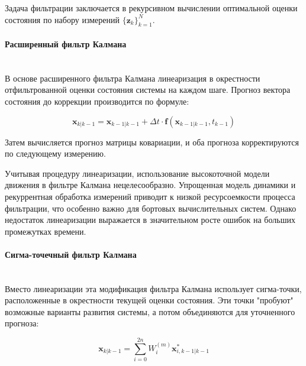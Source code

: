 Задача фильтрации заключается в рекурсивном вычислении оптимальной оценки состояния
по набору измерений $\{\mathbf{z}_k\}_{k=1}^N$. 

\paragraph{Расширенный фильтр Калмана} \mbox{} \\

В основе расширенного фильтра Калмана линеаризация в окрестности отфильтрованной
оценки состояния системы на каждом шаге. Прогноз вектора состояния до коррекции
производится по формуле:

\begin{equation*}
    \mathbf{x}_{k|k-1} = \mathbf{x}_{k-1|k-1} 
    + \Delta t \cdot \mathbf{f} (\mathbf{x}_{k-1|k-1}, t_{k-1})
\end{equation*}

Затем вычисляется прогноз матрицы ковариации, и оба прогноза корректируются по 
следующему измерению.

Учитывая процедуру линеаризации, использование высокоточной модели движения в
фильтре Калмана нецелесообразно. Упрощенная модель динамики и рекуррентная обработка
измерений приводит к низкой ресурсоемкости процесса фильтрации, что особенно важно
для бортовых вычислительных систем. Однако недостаток линеаризации выражается в значительном
росте ошибок на больших промежутках времени.

\paragraph{Сигма-точечный фильтр Калмана} \mbox{} \\

Вместо линеаризации эта модификация фильтра Калмана использует сигма-точки,
расположенные в окрестности текущей оценки состояния. Эти точки "пробуют" возможные
варианты развития системы, а потом объединяются для уточненного прогноза:

\begin{equation*}
    \mathbf{x}_{k|k-1} = \sum_{i = 0}^{2n} W_i^{(m)} \mathbf{x}^{*}_{i, k-1|k-1}
\end{equation*}